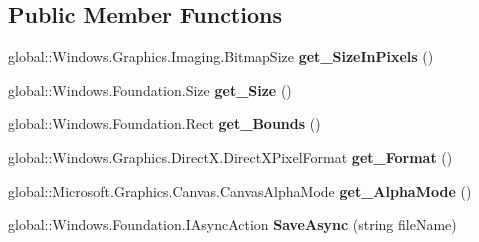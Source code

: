 \subsection*{Public Member Functions}
\begin{DoxyCompactItemize}
\item 
\mbox{\label{interface_microsoft_1_1_graphics_1_1_canvas_1_1_i_canvas_bitmap_af2b4e8d31f7d4a3d849dc0f156a59a7e}} 
global\+::\+Windows.\+Graphics.\+Imaging.\+Bitmap\+Size {\bfseries get\+\_\+\+Size\+In\+Pixels} ()
\item 
\mbox{\label{interface_microsoft_1_1_graphics_1_1_canvas_1_1_i_canvas_bitmap_a0402608b6a37f8002b6fcc5ef95b8003}} 
global\+::\+Windows.\+Foundation.\+Size {\bfseries get\+\_\+\+Size} ()
\item 
\mbox{\label{interface_microsoft_1_1_graphics_1_1_canvas_1_1_i_canvas_bitmap_a9525b7941b7474c214ceda939e8a1f59}} 
global\+::\+Windows.\+Foundation.\+Rect {\bfseries get\+\_\+\+Bounds} ()
\item 
\mbox{\label{interface_microsoft_1_1_graphics_1_1_canvas_1_1_i_canvas_bitmap_a22ceb272a871aee9ccb6f36129c8cb25}} 
global\+::\+Windows.\+Graphics.\+Direct\+X.\+Direct\+X\+Pixel\+Format {\bfseries get\+\_\+\+Format} ()
\item 
\mbox{\label{interface_microsoft_1_1_graphics_1_1_canvas_1_1_i_canvas_bitmap_ab31c90d55255a3b262b19e7af008fb29}} 
global\+::\+Microsoft.\+Graphics.\+Canvas.\+Canvas\+Alpha\+Mode {\bfseries get\+\_\+\+Alpha\+Mode} ()
\item 
\mbox{\label{interface_microsoft_1_1_graphics_1_1_canvas_1_1_i_canvas_bitmap_ac4992fe87b3aa1e80423da03fcea6acf}} 
global\+::\+Windows.\+Foundation.\+I\+Async\+Action {\bfseries Save\+Async} (string file\+Name)
\item 
\mbox{\label{interface_microsoft_1_1_graphics_1_1_canvas_1_1_i_canvas_bitmap_aca107d6a479f4ea4b88f2265a278dedc}} 

\end{DoxyCompactItemize}
